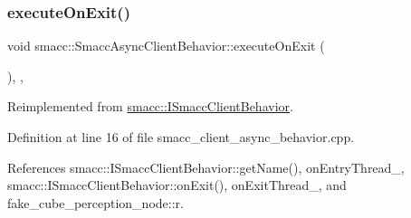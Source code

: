 \subsubsection{\texorpdfstring{execute\+On\+Exit()}{executeOnExit()}}
{\footnotesize\ttfamily void smacc\+::\+Smacc\+Async\+Client\+Behavior\+::execute\+On\+Exit (\begin{DoxyParamCaption}{ }\end{DoxyParamCaption})\hspace{0.3cm}{\ttfamily [override]}, {\ttfamily [protected]}, {\ttfamily [virtual]}}



Reimplemented from \hyperlink{classsmacc_1_1ISmaccClientBehavior_ac88fbad78c928b4bca6d18659ddfd8c0}{smacc\+::\+I\+Smacc\+Client\+Behavior}.



Definition at line 16 of file smacc\+\_\+client\+\_\+async\+\_\+behavior.\+cpp.



References smacc\+::\+I\+Smacc\+Client\+Behavior\+::get\+Name(), on\+Entry\+Thread\+\_\+, smacc\+::\+I\+Smacc\+Client\+Behavior\+::on\+Exit(), on\+Exit\+Thread\+\_\+, and fake\+\_\+cube\+\_\+perception\+\_\+node\+::r.


